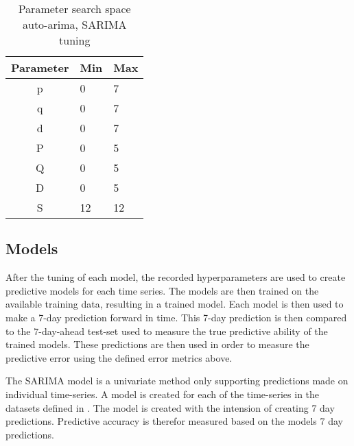   \begin{table}[h]
    \centering
    \caption{Parameter search space auto-arima, SARIMA tuning}
    \label{table:method:arima-tuning}
    \begin{tabular}{|c|l|l|}\hline
      Parameter & Min & Max \\ \hline
      p         & 0   & 7   \\ \hline
      q         & 0   & 7   \\ \hline
      d         & 0   & 7   \\ \hline
      P         & 0   & 5   \\ \hline
      Q         & 0   & 5   \\ \hline
      D         & 0   & 5   \\ \hline
      S         & 12  & 12  \\ \hline
    \end{tabular}
  \end{table}


  \subsection{Models}

  After the tuning of each model, the recorded hyperparameters are used to create predictive models for each time series.
  The models are then trained on the available training data, resulting in a trained model.
  Each model is then used to make a 7-day prediction forward in time.
  This 7-day prediction is then compared to the 7-day-ahead test-set used to measure the true predictive ability of the trained models.
  These predictions are then used in order to measure the predictive error using the defined error metrics above.



\fi



\iffalse
  The SARIMA model is a univariate method only supporting predictions made on individual time-series.
  A model is created for each of the time-series in the datasets defined in .
  The model is created with the intension of creating 7 day predictions.
  Predictive accuracy is therefor measured based on the models 7 day predictions.

